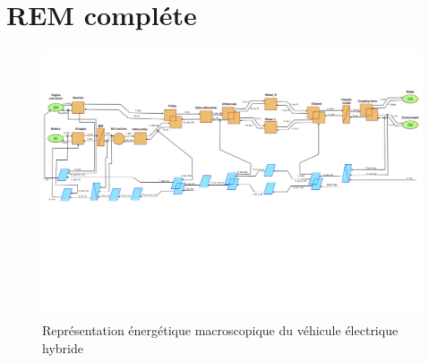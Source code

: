 	\appendix
	\appendixpage
	\addappheadtotoc

\section{REM compléte}\FloatBarrier
\begin{figure}
\begin{center}
	\includegraphics[width=1.1\textwidth,angle=0]{images/REM.png}
	\caption{Représentation énergétique macroscopique du véhicule électrique hybride}\label{img:REM du VEH}
\end{center}
\end{figure}
\FloatBarrier